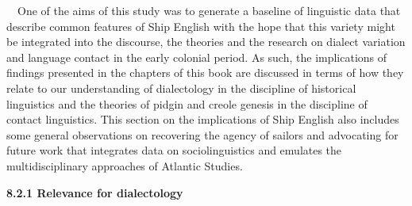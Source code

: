 \begin{styleStandard}
\ \ One of the aims of this study was to generate a baseline of linguistic data that describe common features of Ship English with the hope that this variety might be integrated into the discourse, the theories and the research on dialect variation and language contact in the early colonial period. As such, the implications of findings presented in the chapters of this book are discussed in terms of how they relate to our understanding of dialectology in the discipline of historical linguistics and the theories of pidgin and creole genesis in the discipline of contact linguistics. This section on the implications of Ship English also includes some general observations on recovering the agency of sailors and advocating for future work that integrates data on sociolinguistics and emulates the multidisciplinary approaches of Atlantic Studies.
\end{styleStandard}

\begin{styleStandard}
\textbf{8.2.1 Relevance for dialectology}
\end{styleStandard}

